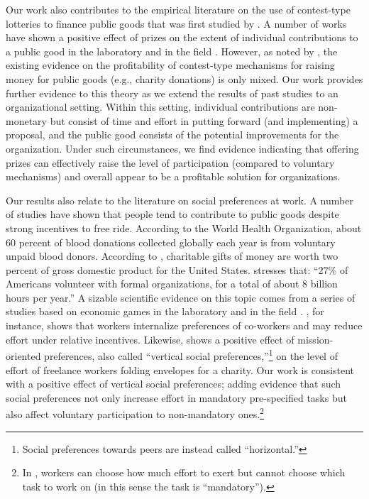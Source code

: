 \documentclass[12pt, titlepage]{article}
\begin{document}
Our work also contributes to the empirical literature on the use of
contest-type lotteries to finance public goods that was first studied by
\citet{morgan2000financing}. A number of works have shown a positive
effect of prizes on the extent of individual contributions to a public
good in the laboratory
\citep{morgan2000funding, dale2004charitable, lange2007using} and in the
field \citep{landry2006toward}. However, as noted by
\citet{vesterlund2012voluntary}, the existing evidence on the
profitability of contest-type mechanisms for raising money for public
goods (e.g., charity donations) is only mixed. Our work provides further
evidence to this theory as we extend the results of past studies to an
organizational setting. Within this setting, individual contributions
are non-monetary but consist of time and effort in putting forward (and
implementing) a proposal, and the public good consists of the potential
improvements for the organization. Under such circumstances, we find
evidence indicating that offering prizes can effectively raise the level
of participation (compared to voluntary mechanisms) and overall appear
to be a profitable solution for organizations.

Our results also relate to the literature on social preferences at work.
A number of studies have shown that people tend to contribute to public
goods despite strong incentives to free ride. According to the World
Health Organization, about 60 percent of blood donations collected
globally each year is from voluntary unpaid blood donors. According to
\citet{list2011market}, charitable gifts of money are worth two percent
of gross domestic product for the United States.
\citet{lacetera2014rewarding} stresses that: ``27\% of Americans
volunteer with formal organizations, for a total of about 8 billion
hours per year.'' A sizable scientific evidence on this topic comes from
a series of studies based on economic games in the laboratory
\citep[see][ for a review]{levitt2007laboratory} and in the field
\citep{bandiera2005social, dellavigna2016estimating}.
\citet{bandiera2005social}, for instance, shows that workers internalize
preferences of co-workers and may reduce effort under relative
incentives. Likewise, \citet{dellavigna2016estimating} shows a positive
effect of mission-oriented preferences, also called ``vertical social
preferences,''\footnote{Social preferences towards peers are instead
  called ``horizontal.''} on the level of effort of freelance workers
folding envelopes for a charity. Our work is consistent with a positive
effect of vertical social preferences; adding evidence that such social
preferences not only increase effort in mandatory pre-specified tasks
but also affect voluntary participation to non-mandatory ones.\footnote{In
  \citet{dellavigna2016estimating}, workers can choose how much effort
  to exert but cannot choose which task to work on (in this sense the
  task is ``mandatory'').}
\end{document}
